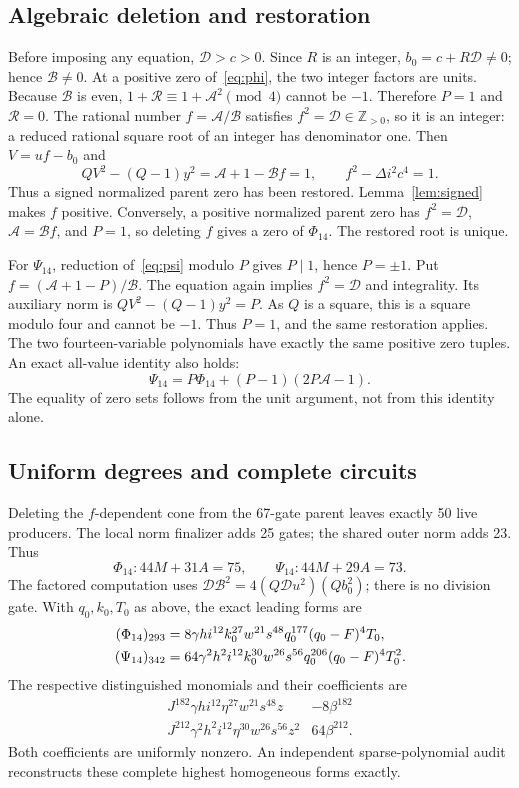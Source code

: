 \documentclass[11pt,a4paper]{article}
\theoremstyle{remark}\newtheorem{remark}[theorem]{Remark}
\newcommand{\Z}{\mathbb Z}
\newcommand{\RR}{\mathcal R}
\newcommand{\Arat}{\mathcal A}
\newcommand{\Brat}{\mathcal B}
\newcommand{\Drat}{\mathcal D}
\begin{document}
\subsection{Algebraic deletion and restoration}
Before imposing any equation, \(\Drat>c>0\). Since \(R\) is an
integer, \(b_0=c+R\Drat\ne0\); hence \(\Brat\ne0\).
At a positive zero of~\eqref{eq:phi}, the two integer factors are units.
Because \(\Brat\) is even,
\(1+\RR\equiv1+\Arat^2\pmod4\) cannot be \(-1\).
Therefore \(P=1\) and \(\RR=0\). The rational number
\(f=\Arat/\Brat\) satisfies \(f^2=\Drat\in\Z_{>0}\), so it is an
integer: a reduced rational square root of an integer has denominator one.
Then \(V=uf-b_0\) and
\[
 QV^2-(Q-1)y^2=\Arat+1-\Brat f=1,
 \qquad f^2-\Delta i^2c^4=1.
\]
Thus a signed normalized parent zero has been restored. Lemma~\ref{lem:signed}
makes \(f\) positive. Conversely, a positive normalized parent zero has
\(f^2=\Drat\), \(\Arat=\Brat f\), and \(P=1\), so deleting \(f\)
gives a zero of \(\Phi_{14}\). The restored root is unique.

For \(\Psi_{14}\), reduction of~\eqref{eq:psi} modulo \(P\) gives
\(P\mid1\), hence \(P=\pm1\). Put
\(f=(\Arat+1-P)/\Brat\). The equation again implies \(f^2=\Drat\)
and integrality. Its auxiliary norm is
\(QV^2-(Q-1)y^2=P\). As \(Q\) is a square, this is a square
modulo four and cannot be \(-1\). Thus \(P=1\), and the same
restoration applies. The two fourteen-variable polynomials have exactly
the same positive zero tuples. An exact all-value identity also holds:
\begin{equation}
 \Psi_{14}=P\Phi_{14}+(P-1)(2P\Arat-1).
\end{equation}
The equality of zero sets follows from the unit argument, not from this
identity alone.

\subsection{Uniform degrees and complete circuits}
Deleting the \(f\)-dependent cone from the 67-gate parent leaves exactly
50 live producers. The local norm finalizer adds 25 gates; the shared
outer norm adds 23. Thus
\[
 \Phi_{14}:44M+31A=75,\qquad\Psi_{14}:44M+29A=73.
\]
The factored computation uses
\(\Drat\Brat^2=4(Q\Drat u^2)(Qb_0^2)\); there is no division gate.
With \(q_0,k_0,T_0\) as above, the exact leading forms are
\begin{align}
 (\Phi_{14})_{293}
 &=8\gamma h i^{12}k_0^{27}w^{21}s^{48}
   q_0^{177}(q_0-F)^4T_0,\notag\\
 (\Psi_{14})_{342}
 &=64\gamma^2h^2i^{12}k_0^{30}w^{26}s^{56}
   q_0^{206}(q_0-F)^4T_0^2.\label{eq:rootleaders}
\end{align}
The respective distinguished monomials and their coefficients are
\[
\begin{array}{c|c}
 J^{182}\gamma h i^{12}\eta^{27}w^{21}s^{48}z&-8\beta^{182}\\
 J^{212}\gamma^2h^2i^{12}\eta^{30}w^{26}s^{56}z^2&64\beta^{212}.
\end{array}
\]
Both coefficients are uniformly nonzero.
An independent sparse-polynomial audit reconstructs these complete
highest homogeneous forms exactly.
\end{document}
